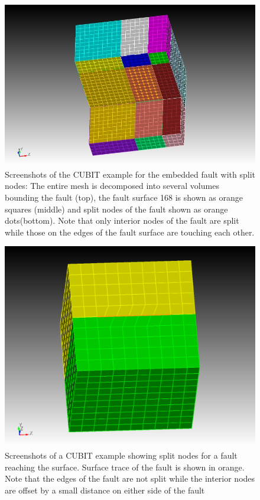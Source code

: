 \begin{figure}[htbp]
\begin{centering}
\includegraphics[scale=0.3]{figures/splitnodes.jpg}
\par
\end{centering}
\caption{Screenshots of the CUBIT example for the embedded fault with split
nodes: The entire mesh is decomposed into several volumes bounding
the fault (top), the fault surface 168 is shown as orange squares
(middle) and split nodes of the fault shown as orange dots(bottom).
Note that only interior nodes of the fault are split while those on
the edges of the fault surface are touching each other.}
\label{fig:examples.splitnodes}
\end{figure}

\begin{figure}[htbp]
\begin{centering}
\includegraphics[scale=0.55]{figures/splitnodes_surfacetrace.pdf}
\par
\end{centering}
\caption{Screenshots of a CUBIT example showing split nodes for a fault reaching
the surface. Surface trace of the fault is shown in orange. Note that
the edges of the fault are not split while the interior nodes are
offset by a small distance on either side of the fault}
\label{fig:examples.splitnodes-surfacetrace}
\end{figure}

